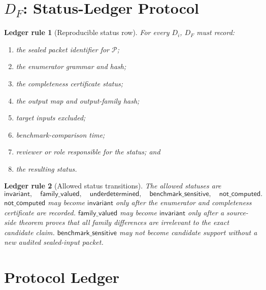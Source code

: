 \documentclass[11pt]{article}
\newcommand{\Pack}{\mathcal{P}}
\newtheorem{ledger}{Ledger rule}
\begin{document}
\section{\texorpdfstring{\(D_F\)}{DF}: Status-Ledger Protocol}

\begin{ledger}[Reproducible status row]
For every \(D_i\), \(D_F\) must record:
\begin{enumerate}
    \item the sealed packet identifier for \(\Pack\);
    \item the enumerator grammar and hash;
    \item the completeness certificate status;
    \item the output map and output-family hash;
    \item target inputs excluded;
    \item benchmark-comparison time;
    \item reviewer or role responsible for the status; and
    \item the resulting status.
\end{enumerate}
\end{ledger}

\begin{ledger}[Allowed status transitions]
The allowed statuses are
\[
\mathsf{invariant},\quad
\mathsf{family\_valued},\quad
\mathsf{underdetermined},\quad
\mathsf{benchmark\_sensitive},\quad
\mathsf{not\_computed}.
\]
\(\mathsf{not\_computed}\) may become \(\mathsf{invariant}\) only after the
enumerator and completeness certificate are recorded. \(\mathsf{family\_valued}\)
may become \(\mathsf{invariant}\) only after a source-side theorem proves
that all family differences are irrelevant to the exact candidate claim.
\(\mathsf{benchmark\_sensitive}\) may not become candidate support without a
new audited sealed-input packet.
\end{ledger}

\section{Protocol Ledger}
\end{document}
